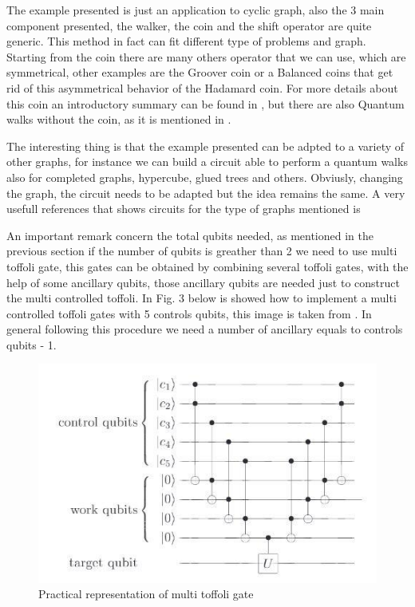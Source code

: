 The example presented is just an application to cyclic graph, also the 3 main component presented, the walker, 
the coin and the shift operator are quite generic. This method in fact can fit different type of problems and graph.
Starting from the coin there are many others operator that we can use, which are symmetrical, other examples are the 
Groover coin or a Balanced coins that get rid of this asymmetrical behavior of the Hadamard coin. For more details
about this coin an introductory summary can be found in \cite{Kempe_2003}, but there are also Quantum walks without
the coin, as it is mentioned in \cite{6812670}.


The interesting thing is that the example presented can be adpted to a variety of other graphs, for instance we can
build a circuit able to perform a quantum walks also for completed graphs, hypercube, glued trees and others. 
Obviusly, changing the graph, the circuit needs to be adapted but the idea remains the same. A very usefull 
references that shows circuits for the type of graphs mentioned is \cite{douglas2007efficient}


An important remark concern the total qubits needed, as mentioned in the previous section if
the number of qubits is greather than 2 we need to use multi toffoli gate, this gates can be 
obtained by combining several toffoli gates, with the help of some ancillary qubits, those 
ancillary qubits are needed just to construct the multi controlled toffoli. In Fig. 3 below
is showed how to implement a multi controlled toffoli gates with 5 controls qubits, 
this image is taken from \cite{nielsen_chuang_2010}. In general following this procedure
we need a number of ancillary equals to controls qubits - 1.

\begin{figure}[h!]
    \includegraphics[scale=0.5]{img/ancillary.jpg}
    \caption{Practical representation of multi toffoli gate}
    \centering
\end{figure}

